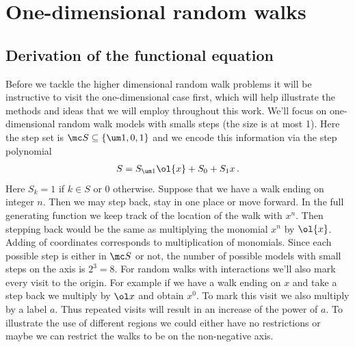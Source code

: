 
\chapter{One-dimensional random walks}
\label{ch:1DExample}

\section{Derivation of the functional equation}
\label{sec:DerFxnEqn}

Before we tackle  the higher dimensional random walk problems it will be instructive to visit the one-dimensional case first, which will help illustrate the methods and ideas that we will employ throughout this work. We'll focus on one-dimensional random walk models with smalls steps (the size is at most 1). Here the step set is $\mc S \subseteq \{\um 1, 0, 1\}$ and we encode this information via the step polynomial
\begin{align}
	S = S_{\um 1}\ol{x} + S_0 + S_1 x\,.
\end{align}
Here $S_k = 1$ if $k \in S$ or $0$ otherwise. Suppose that we have a walk ending on integer $n$. Then we may step back, stay in one place or move forward. In the full generating function we keep track of the location of the walk with $x^n$. Then stepping back would be the same as multiplying the monomial $x^n$ by $\ol{x}$. Adding of coordinates corresponds to multiplication of monomials. Since each possible step is either in $\mc S$ or not, the number of possible models with small steps on the axis is $2^3 = 8$. For random walks with interactions we'll also mark every visit to the origin. For example if we have a walk ending on $x$ and take a step back we multiply by $\ol x$ and obtain $x^0$. To mark this visit we also multiply by a label $a$. Thus repeated visits will result in an increase of the power of $a$. To illustrate the use of different regions we could either have no restrictions or maybe we can restrict the walks to be on the non-negative axis.

